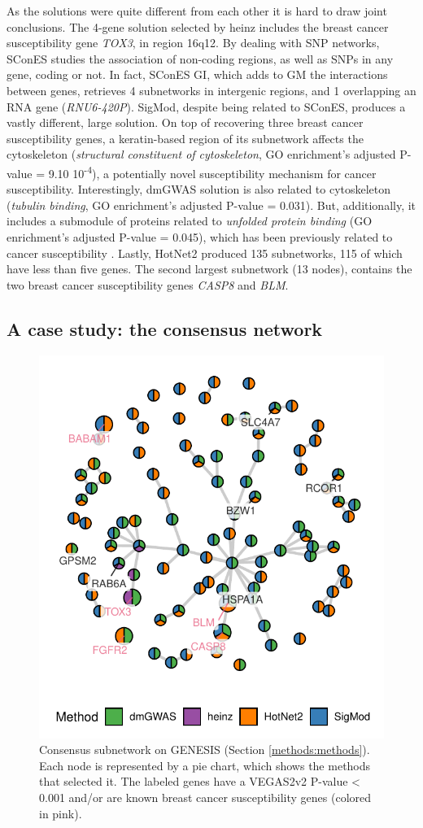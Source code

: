 \documentclass[twocolumn, 11pt, draft]{article}
\begin{document}
As the solutions were quite different from each other it is hard to draw joint conclusions. The 4-gene solution selected by heinz includes the breast cancer susceptibility gene \emph{TOX3}, in region 16q12. By dealing with SNP networks, SConES studies the association of non-coding regions, as well as SNPs in any gene, coding or not. In fact, SConES GI, which adds to GM the interactions between genes, retrieves 4 subnetworks in intergenic regions, and 1 overlapping an RNA gene (\emph{RNU6-420P}). SigMod, despite being related to SConES, produces a vastly different, large solution. On top of recovering three breast cancer susceptibility genes, a keratin-based region of its subnetwork affects the cytoskeleton (\emph{structural constituent of cytoskeleton}, GO enrichment's adjusted P-value = 9.10 \texttimes{} 10\textsuperscript{-4}), a potentially novel susceptibility mechanism for cancer susceptibility. Interestingly, dmGWAS solution is also related to cytoskeleton (\emph{tubulin binding}, GO enrichment's adjusted P-value = 0.031). But, additionally, it includes a submodule of proteins related to \emph{unfolded protein binding} (GO enrichment's adjusted P-value = 0.045), which has been previously related to cancer susceptibility \cite{calderwood_heat_2016}. Lastly, HotNet2 produced 135 subnetworks, 115 of which have less than five genes. The second largest subnetwork (13 nodes), contains the two breast cancer susceptibility genes \emph{CASP8} and \emph{BLM}.

\subsection{A case study: the consensus network}
\label{results:consensus}
\begin{figure}[htbp]
  \centering
  \includegraphics[width=.5\linewidth]{./figures/figure_3.pdf}
  \caption{\label{fig:consensus}
    Consensus subnetwork on GENESIS (Section \ref{methods:methods}). Each node is represented by a pie chart, which shows the methods that selected it. The labeled genes have a VEGAS2v2 P-value < 0.001 and/or are known breast cancer susceptibility genes (colored in pink).}
\end{figure}
\end{document}
